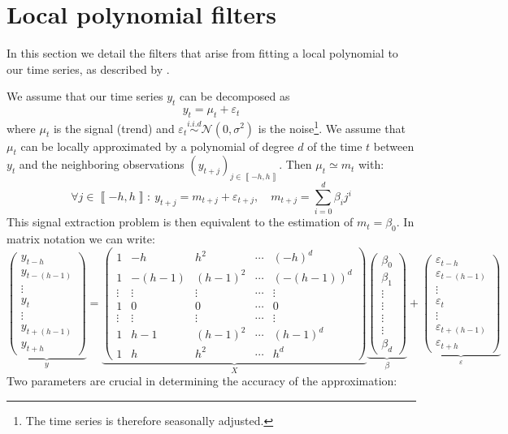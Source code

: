 \documentclass[
  12pt,
  ,
  a4paper]{article}
\newcommand\1{\mathds{1}}
\begin{document}
\hypertarget{sec:lppfilters}{%
\section{Local polynomial filters}\label{sec:lppfilters}}

In this section we detail the filters that arise from fitting a local polynomial to our time series, as described by \textcite{proietti2008}.

We assume that our time series \(y_t\) can be decomposed as
\[
y_t=\mu_t+\varepsilon_t
\]
where \(\mu_t\) is the signal (trend) and \(\varepsilon_{t}\overset{i.i.d}{\sim}\mathcal{N}(0,\sigma^{2})\) is the noise\footnote{The time series is therefore seasonally adjusted.}.
We assume that \(\mu_t\) can be locally approximated by a polynomial of degree \(d\) of the time \(t\) between \(y_t\) and the neighboring observations \(\left(y_{t+j}\right)_{j\in\left\llbracket -h,h\right\rrbracket}\).
Then \(\mu_t\simeq m_{t}\) with:
\[
\forall j\in\left\llbracket -h,h\right\rrbracket :\:
y_{t+j}=m_{t+j}+\varepsilon_{t+j},\quad m_{t+j}=\sum_{i=0}^{d}\beta_{i}j^{i}
\]
This signal extraction problem is then equivalent to the estimation of \(m_t=\beta_0\). In matrix notation we can write:
\[
\underbrace{\begin{pmatrix}y_{t-h}\\
y_{t-(h-1)}\\
\vdots\\
y_{t}\\
\vdots\\
y_{t+(h-1)}\\
y_{t+h}
\end{pmatrix}}_{y}=\underbrace{\begin{pmatrix}1 & -h & h^{2} & \cdots & (-h)^{d}\\
1 & -(h-1) & (h-1)^{2} & \cdots & (-(h-1))^{d}\\
\vdots & \vdots & \vdots & \cdots & \vdots\\
1 & 0 & 0 & \cdots & 0\\
\vdots & \vdots & \vdots & \cdots & \vdots\\
1 & h-1 & (h-1)^{2} & \cdots & (h-1)^{d}\\
1 & h & h^{2} & \cdots & h^{d}
\end{pmatrix}}_{X}\underbrace{\begin{pmatrix}\beta_{0}\\
\beta_{1}\\
\vdots\\
\vdots\\
\vdots\\
\vdots\\
\beta_{d}
\end{pmatrix}}_{\beta}+\underbrace{\begin{pmatrix}\varepsilon_{t-h}\\
\varepsilon_{t-(h-1)}\\
\vdots\\
\varepsilon_{t}\\
\vdots\\
\varepsilon_{t+(h-1)}\\
\varepsilon_{t+h}
\end{pmatrix}}_{\varepsilon}
\]
Two parameters are crucial in determining the accuracy of the approximation:
\end{document}
